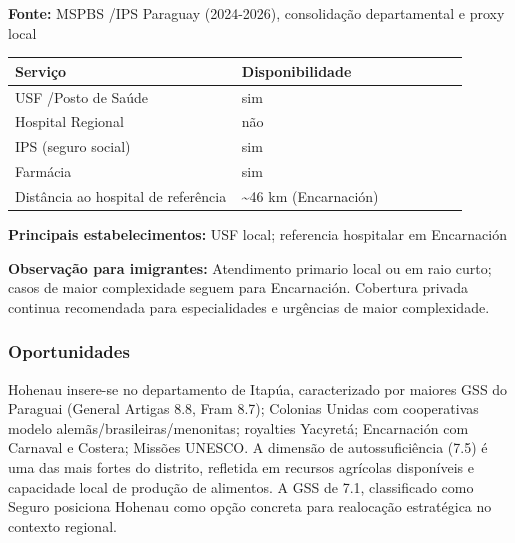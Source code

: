 \textbf{Fonte:} MSPBS /\allowbreak  IPS Paraguay (2024-2026), consolidação
departamental e proxy local

{\def\LTcaptype{none} %
\begin{longtable}{@{}>{\raggedright\arraybackslash}p{0.45\linewidth} >{\raggedright\arraybackslash}p{0.45\linewidth}@{}}
\toprule\noalign{}
Serviço & Disponibilidade \\
\midrule\noalign{}
\endhead
\bottomrule\noalign{}
\endlastfoot
USF /\allowbreak  Posto de Saúde & sim \\
Hospital Regional & não \\
IPS (seguro social) & sim \\
Farmácia & sim \\
Distância ao hospital de referência & \textasciitilde46 km
(Encarnación) \\
\end{longtable}
}

\textbf{Principais estabelecimentos:} USF local; referencia hospitalar
em Encarnación

\textbf{Observação para imigrantes:} Atendimento primario local ou em
raio curto; casos de maior complexidade seguem para Encarnación.
Cobertura privada continua recomendada para especialidades e urgências
de maior complexidade.
\newpage

\subsubsection*{Oportunidades}\label{oport-hohenau-0714}
Hohenau insere-se no departamento de Itapúa, caracterizado por maiores GSS do Paraguai (General Artigas 8.8, Fram 8.7); Colonias Unidas com cooperativas modelo alemãs/brasileiras/menonitas; royalties Yacyretá; Encarnación com Carnaval e Costera; Missões UNESCO. A dimensão de autossuficiência (7.5) é uma das mais fortes do distrito, refletida em recursos agrícolas disponíveis e capacidade local de produção de alimentos. A GSS de 7.1, classificado como Seguro posiciona Hohenau como opção concreta para realocação estratégica no contexto regional.

